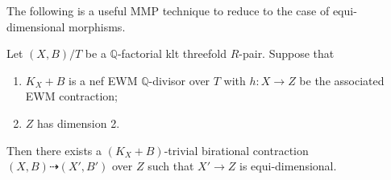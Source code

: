 The following is a useful MMP technique to reduce to the case of equi-dimensional morphisms.

\begin{proposition}\label{three}
	Let $(X,B)/T$ be a $\mathbb{Q}$-factorial klt threefold $R$-pair.
	Suppose that
	\begin{enumerate}
		\item $K_X+B$ is a nef EWM $\mathbb{Q}$-divisor over $T$ with  $h \colon X \to Z$ be the associated EWM contraction;
		\item $Z$ has dimension 2.
	\end{enumerate}
	Then there exists a $(K_X+B)$-trivial birational contraction $(X,B) \dashrightarrow (X', B')$ over $Z$ such that $X' \to Z$ is equi-dimensional. 
\end{proposition}

